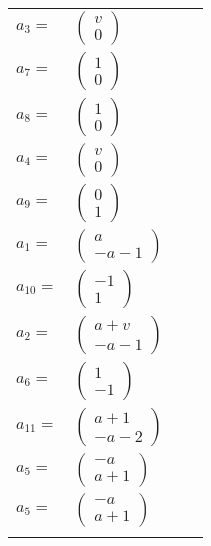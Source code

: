 \documentclass[1p]{elsarticle_modified}
\theoremstyle{definition}
\begin{document}
\begin{tabular}{m{7pt} m{180pt} m{7pt} m{180pt} }
\flushright $a_{3}=$&$\begin{pmatrix}v\\0\end{pmatrix}$ \\
\flushright $a_{7}=$&$\begin{pmatrix}1\\0\end{pmatrix}$ \\
\flushright $a_{8}=$&$\begin{pmatrix}1\\0\end{pmatrix}$ \\
\flushright $a_{4}=$&$\begin{pmatrix}v\\0\end{pmatrix}$ \\
\flushright $a_{9}=$&$\begin{pmatrix}0\\1\end{pmatrix}$ \\
\flushright $a_{1}=$&$\begin{pmatrix}a\\- a-1\end{pmatrix}$ \\
\flushright $a_{10}=$&$\begin{pmatrix}-1\\1\end{pmatrix}$ \\
\flushright $a_{2}=$&$\begin{pmatrix}a+v\\- a-1\end{pmatrix}$ \\
\flushright $a_{6}=$&$\begin{pmatrix}1\\-1\end{pmatrix}$ \\
\flushright $a_{11}=$&$\begin{pmatrix}a+1\\- a-2\end{pmatrix}$ \\
\flushright $a_{5}=$&$\begin{pmatrix}- a\\a+1\end{pmatrix}$\\ \flushright $a_{5}=$&$\begin{pmatrix}- a\\a+1\end{pmatrix}$\\&\end{tabular}
\end{document}
